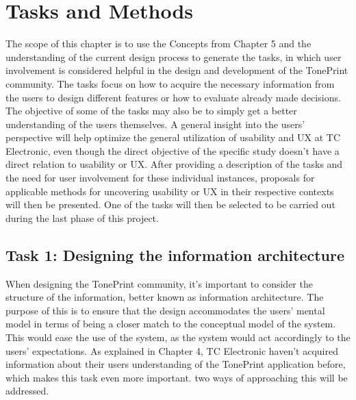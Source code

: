 \chapter{Tasks and Methods}
\label{TaskAndMethods}
The scope of this chapter is to use the Concepts from Chapter 5 and the understanding of the current design process to generate the tasks, in which user involvement is considered helpful in the design and development of the TonePrint community. The tasks focus on how to acquire the necessary information from the users to design different features or how to evaluate already made decisions. The objective of some of the tasks may also be to simply get a better understanding of the users themselves. A general insight into the users' perspective will help optimize the general utilization of usability and UX at TC Electronic, even though the direct objective of the specific study doesn't have a direct relation to usability or UX. After providing a description of the tasks and the need for user involvement for these individual instances, proposals for applicable methods for uncovering usability or UX in their respective contexts will then be presented. One of the tasks will then be selected to be carried out during the last phase of this project.



\section{Task 1: Designing the information architecture}
\label{Task1}
When designing the TonePrint community, it's important to consider the structure of the information, better known as information architecture. The purpose of this is to ensure that the design accommodates the users' mental model in terms of being a closer match to the conceptual model of the system. This would ease the use of the system, as the system would act accordingly to the users' expectations. As explained in Chapter 4, TC Electronic haven't acquired information about their users understanding of the TonePrint application before, which makes this task even more important. two ways of approaching this will be addressed. \\

